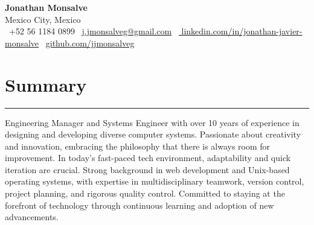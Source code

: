 \documentclass[a4paper,10pt]{article}
\begin{document}
\begin{center}
	{\LARGE \textbf{Jonathan Monsalve}} \\[0.5em]
	Mexico City, Mexico \\
	\faPhone \ +52 56 1184 0899 \hspace{1em}
	\faEnvelope \ \href{mailto:j.jmonsalveg@gmail.com}{j.jmonsalveg@gmail.com}
	\hspace{1em}
	\faLinkedin \ \href{http://linkedin.com/in/jonathan-javier-monsalve}{
		linkedin.com/in/jonathan-javier-monsalve} \hspace{1em}
	\faGithub \ \href{https://github.com/jjmonsalveg}{github.com/jjmonsalveg}
\end{center}

\vspace{0.5em}

\newcommand{\sectionline}{
	\noindent\rule{\linewidth}{0.4pt}\vspace{0.1em}
}

\section*{Summary}
\sectionline
Engineering Manager and Systems Engineer with over 10 years of experience in
designing and developing diverse computer systems. Passionate about creativity
and innovation, embracing the philosophy that there is always room for
improvement. In today's fast-paced tech environment, adaptability and quick
iteration are crucial. Strong background in web development and Unix-based
operating systems, with expertise in multidisciplinary teamwork, version
control, project planning, and rigorous quality control. Committed to staying
at the forefront of technology through continuous learning and adoption of
new advancements.

\end{document}
